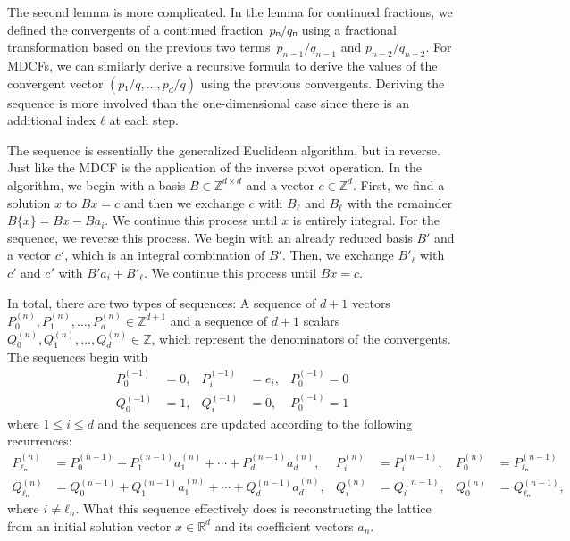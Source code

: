 The second lemma is more complicated.
In the lemma for continued fractions,
we defined the convergents of a continued fraction~$pₙ/qₙ$
using a fractional transformation based on the previous two
terms~$p_{n-1}/q_{n-1}$ and $p_{n-2}/q_{n-2}$.
For MDCFs, we can similarly derive a recursive formula to derive the values of
the convergent vector $(p₁/q, \dots, p_d/q)$ using the previous convergents.
Deriving the sequence is more involved than the one-dimensional case since
there is an additional index $ℓ$ at each step.

The sequence is essentially the generalized Euclidean algorithm, but in reverse.
Just like the MDCF is the application of the inverse pivot operation.
In the algorithm, we begin with a basis $B ∈ ℤ^{d×d}$ and a vector $c ∈ ℤ^d$.
First, we find a solution $x$ to $Bx = c$ and then we exchange $c$ with $B_ℓ$
and $B_ℓ$ with the remainder $B\{x\} = Bx - Ba_i$.
We continue this process until $x$ is entirely integral.
For the sequence, we reverse this process.
We begin with an already reduced basis $B'$ and a vector $c'$, which is an
integral combination of $B'$.
Then, we exchange $B'_{ℓ}$ with $c'$ and $c'$ with $B' a_i + B'_{ℓ}$.
We continue this process until $B x = c$.

In total, there are two types of sequences:
A sequence of $d+1$ vectors $P_0^{(n)}, P_1^{(n)}, …, P_d^{(n)} ∈ ℤ^{d+1}$ and a sequence
of $d+1$ scalars $Q_0^{(n)}, Q_1^{(n)}, …, Q_d^{(n)} ∈ ℤ$,
which represent the denominators of the convergents.
The sequences begin with
\begin{align*}
  P_0^{(-1)} & = 0, & P_i^{(-1)} & = e_i, & P_0^{(-1)} = 0 \\
  Q_0^{(-1)} & = 1, & Q_i^{(-1)} & = 0,   & P_0^{(-1)} = 1
\end{align*}
where $1 ≤ i ≤ d$ and the sequences are updated according to the following
recurrences:
\begin{align*}
  P_{ℓₙ}^{(n)} & = P_0^{(n-1)} + P_1^{(n-1)} a_1^{(n)} + ⋯ + P_d^{(n-1)} a_d^{(n)}, &
  P_i^{(n)} & = P_i^{(n-1)}, &
  P_0^{(n)} & = P_{ℓₙ}^{(n-1)} \\
  Q_{ℓₙ}^{(n)} & = Q_0^{(n-1)} + Q_1^{(n-1)} a_1^{(n)} + ⋯ + Q_d^{(n-1)} a_d^{(n)}, &
  Q_i^{(n)} & = Q_i^{(n-1)}, &
  Q_0^{(n)} & = Q_{ℓₙ}^{(n-1)},
\end{align*}
where $i ≠ ℓ_n$.
What this sequence effectively does is reconstructing the lattice from an
initial solution vector $x ∈ ℝ^d$ and its coefficient vectors $a_n$.

